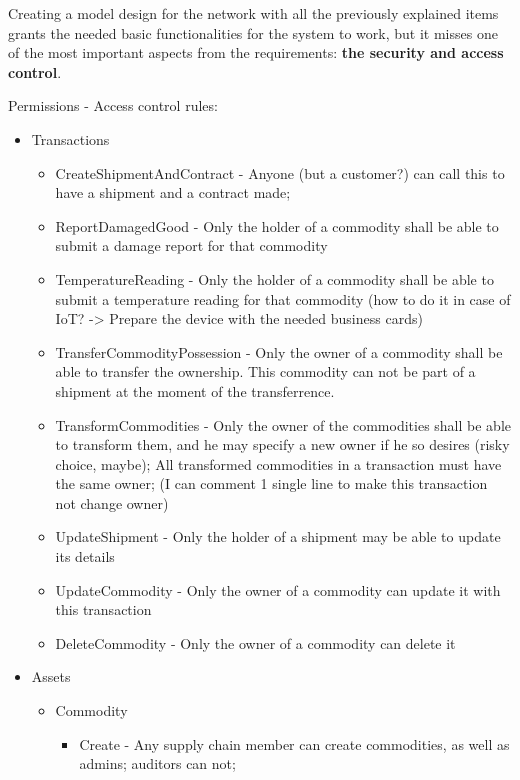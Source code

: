 Creating a model design for the network with all the previously explained items grants the needed basic functionalities for the system to work, but it misses one of the most important aspects from the requirements: \textbf{the security and access control}.


Permissions - Access control rules:
\begin{itemize}
    \item Transactions
        \begin{itemize}
		\item CreateShipmentAndContract - Anyone (but a customer?) can call this to have a shipment and a contract made;
		\item ReportDamagedGood - Only the holder of a commodity shall be able to submit a damage report for that commodity
		\item TemperatureReading - Only the holder of a commodity shall be able to submit a temperature reading for that commodity (how to do it in case of IoT? -> Prepare the device with the needed business cards)
		\item TransferCommodityPossession - Only the owner of a commodity shall be able to transfer the ownership. This commodity can not be part of a shipment at the moment of the transferrence. 
		\item TransformCommodities - Only the owner of the commodities shall be able to transform them, and he may specify a new owner if he so desires (risky choice, maybe); All transformed commodities in a transaction must have the same owner; (I can comment 1 single line to make this transaction not change owner)
		\item UpdateShipment - Only the holder of a shipment may be able to update its details
		\item UpdateCommodity - Only the owner of a commodity can update it with this transaction
		\item DeleteCommodity - Only the owner of a commodity can delete it
		\end{itemize}
    \item Assets
        \begin{itemize}
        \item Commodity
            \begin{itemize}
			\item Create - Any supply chain member can create commodities, as well as admins; auditors can not;

\end{itemize}
\end{itemize}
\end{itemize}
